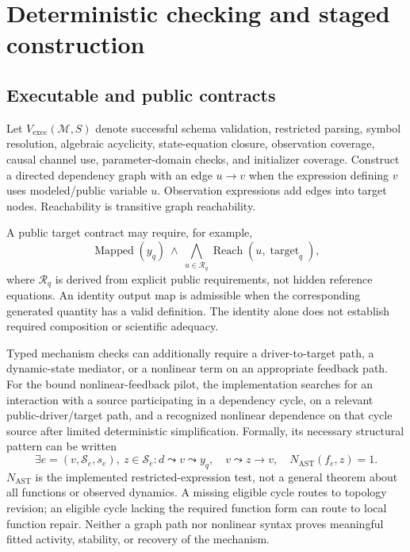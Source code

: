 \documentclass[11pt]{article}
\newcommand{\M}{\mathcal{M}}
\begin{document}
\section{Deterministic checking and staged construction}
\label{sec:construction}

\subsection{Executable and public contracts}
Let $V_{\mathrm{exec}}(\M,S)$ denote successful schema validation, restricted
parsing, symbol resolution, algebraic acyclicity, state-equation closure,
observation coverage, causal channel use, parameter-domain checks, and initializer
coverage. Construct a directed dependency graph with an edge $u\to v$ when the
expression defining $v$ uses modeled/public variable $u$. Observation expressions
add edges into target nodes. Reachability is transitive graph reachability.

A public target contract may require, for example,
\begin{equation}
 \operatorname{Mapped}(y_q)\ \land\
 \bigwedge_{u\in\mathcal R_q}\operatorname{Reach}(u,\operatorname{target}_q),
 \label{eq:target-contract}
\end{equation}
where $\mathcal R_q$ is derived from explicit public requirements, not hidden
reference equations. An identity output map is admissible when the corresponding
generated quantity has a valid definition. The identity alone does not establish
required composition or scientific adequacy.

Typed mechanism checks can additionally require a driver-to-target path, a
dynamic-state mediator, or a nonlinear term on an appropriate feedback path.
For the bound nonlinear-feedback pilot, the implementation searches for an
interaction with a source participating in a dependency cycle, on a relevant
public-driver/target path, and a recognized nonlinear dependence on that cycle
source after limited deterministic simplification. Formally, its necessary
structural pattern can be written
\begin{equation}
 \exists e=(v,\mathcal S_e,s_e),\ z\in\mathcal S_e:
 d\leadsto v\leadsto y_q,\quad
 v\leadsto z\to v,\quad N_{\mathrm{AST}}(f_e,z)=1.
\end{equation}
$N_{\mathrm{AST}}$ is the implemented restricted-expression test, not a general
theorem about all functions or observed dynamics. A missing eligible cycle routes
to topology revision; an eligible cycle lacking the required function form can
route to local function repair. Neither a graph path nor nonlinear syntax proves
meaningful fitted activity, stability, or recovery of the mechanism.
\end{document}
